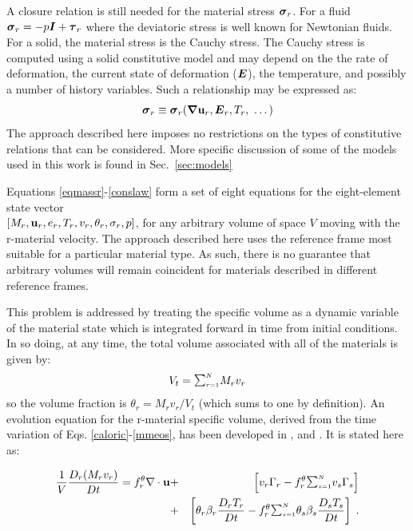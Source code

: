 A closure relation is still needed for the
material stress $\boldsymbol{\sigma}_r$.  For a fluid $\boldsymbol{\sigma}_r = -p\boldsymbol{I} +
\boldsymbol{\tau}_r$ where the deviatoric stress is well known for Newtonian fluids.
For a solid, the material stress is the Cauchy stress.  The Cauchy
stress is computed using a solid constitutive model and may depend on the 
the rate of deformation, the current state of deformation ($\boldsymbol{E}$), 
the temperature, and possibly a number of history variables.  Such a 
relationship may be expressed as:
\begin{equation}
{\ensuremath{\boldsymbol{\sigma}}}_r \equiv \boldsymbol{\sigma}_r(\boldsymbol{\nabla}\mathbf{u}_r, \boldsymbol{E}_r, T_r,~ \dots)
\label{conslaw}
\end{equation}
The approach described here imposes no restrictions on the types of 
constitutive relations that can be considered.  More specific discussion 
of some of the models used in this work is found in Sec.~\ref{sec:models}

Equations \ref{eqmassr}-\ref{conslaw} form a set of eight equations for
the eight-element state vector \\
$[M_r, \mathbf{u}_r, e_r, T_r, v_r, \theta_r, \sigma_r, p]$, 
for any arbitrary volume of space $V$ moving with the r-material velocity.
The approach described here uses the reference frame most suitable
for a particular material type.  As such, there is no guarantee that 
arbitrary volumes will remain coincident for materials described in 
different reference frames.

This problem is addressed by treating the specific volume as a dynamic variable
of the material state which is integrated forward in time from initial 
conditions.  In so doing, at any time, the total volume associated 
with all of the materials is given by:
\begin{eqnarray}
V_t = {\raise1.5pt\hbox{$\scriptstyle\sum_{r=1}^N$}} M_r v_r
\end{eqnarray}
so the volume fraction is $\theta_r = M_r v_r / V_t$
(which sums to one by definition).
An evolution equation for the r-material specific volume, derived from the 
time variation of Eqs. \ref{caloric}-\ref{mmeos},
has been developed in \cite{Kashiwa1996}, \cite{Kashiwa2000} and 
\cite{Lewis1998}.
It is stated here as:

\begin{eqnarray}
{1\over V}{D_r (M_r v_r) \over Dt} =
f_r^{\theta} \nabla \cdot \Bu &+&
\left[v_r \Gamma_r -
f_r^{\theta} {\raise1.5pt\hbox{$\scriptstyle\sum_{s=1}^N$}}
v_s \Gamma_s \right]  \nonumber \\ &+&
\left[\theta_r
\beta_r {D_r T_r\over Dt} -
f_r^{\theta} {\raise1.5pt\hbox{$\scriptstyle\sum_{s=1}^N$}}
\theta_s \beta_s {D_s T_s\over Dt} \right] \; .
\label{eqspvolr}
\end{eqnarray}

